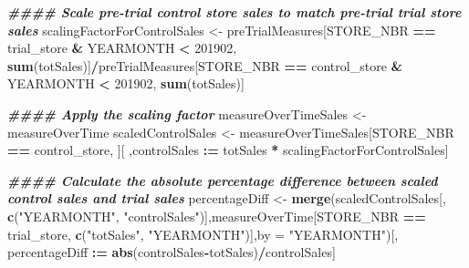 \documentclass[
]{article}
\newenvironment{Shaded}{\begin{snugshade}}{\end{snugshade}}
\newcommand{\AttributeTok}[1]{\textcolor[rgb]{0.13,0.29,0.53}{#1}}
\newcommand{\DecValTok}[1]{\textcolor[rgb]{0.00,0.00,0.81}{#1}}
\newcommand{\DocumentationTok}[1]{\textcolor[rgb]{0.56,0.35,0.01}{\textbf{\textit{#1}}}}
\newcommand{\FunctionTok}[1]{\textcolor[rgb]{0.13,0.29,0.53}{\textbf{#1}}}
\newcommand{\NormalTok}[1]{#1}
\newcommand{\OtherTok}[1]{\textcolor[rgb]{0.56,0.35,0.01}{#1}}
\newcommand{\SpecialCharTok}[1]{\textcolor[rgb]{0.81,0.36,0.00}{\textbf{#1}}}
\newcommand{\StringTok}[1]{\textcolor[rgb]{0.31,0.60,0.02}{#1}}
\begin{document}
\begin{Shaded}
\begin{Highlighting}[]
\DocumentationTok{\#\#\#\# Scale pre{-}trial control store sales to match pre{-}trial trial store sales}
\NormalTok{scalingFactorForControlSales }\OtherTok{\textless{}{-}}\NormalTok{ preTrialMeasures[STORE\_NBR }\SpecialCharTok{==}\NormalTok{ trial\_store }\SpecialCharTok{\&}
\NormalTok{YEARMONTH }\SpecialCharTok{\textless{}} \DecValTok{201902}\NormalTok{, }\FunctionTok{sum}\NormalTok{(totSales)]}\SpecialCharTok{/}\NormalTok{preTrialMeasures[STORE\_NBR }\SpecialCharTok{==}
\NormalTok{control\_store }\SpecialCharTok{\&}\NormalTok{ YEARMONTH }\SpecialCharTok{\textless{}} \DecValTok{201902}\NormalTok{, }\FunctionTok{sum}\NormalTok{(totSales)]}

\DocumentationTok{\#\#\#\# Apply the scaling factor}
\NormalTok{measureOverTimeSales }\OtherTok{\textless{}{-}}\NormalTok{ measureOverTime}
\NormalTok{scaledControlSales }\OtherTok{\textless{}{-}}\NormalTok{ measureOverTimeSales[STORE\_NBR }\SpecialCharTok{==}\NormalTok{ control\_store, ][ ,controlSales }\SpecialCharTok{:=}\NormalTok{ totSales }\SpecialCharTok{*}\NormalTok{ scalingFactorForControlSales]}

\DocumentationTok{\#\#\#\# Calculate the absolute percentage difference between scaled control sales and trial sales}
\NormalTok{percentageDiff }\OtherTok{\textless{}{-}} \FunctionTok{merge}\NormalTok{(scaledControlSales[, }\FunctionTok{c}\NormalTok{(}\StringTok{"YEARMONTH"}\NormalTok{, }\StringTok{"controlSales"}\NormalTok{)],measureOverTime[STORE\_NBR }\SpecialCharTok{==}\NormalTok{ trial\_store, }\FunctionTok{c}\NormalTok{(}\StringTok{"totSales"}\NormalTok{, }\StringTok{"YEARMONTH"}\NormalTok{)],}\AttributeTok{by =} \StringTok{"YEARMONTH"}\NormalTok{)[, percentageDiff }\SpecialCharTok{:=} \FunctionTok{abs}\NormalTok{(controlSales}\SpecialCharTok{{-}}\NormalTok{totSales)}\SpecialCharTok{/}\NormalTok{controlSales]}


\end{Highlighting}
\end{Shaded}
\end{document}
